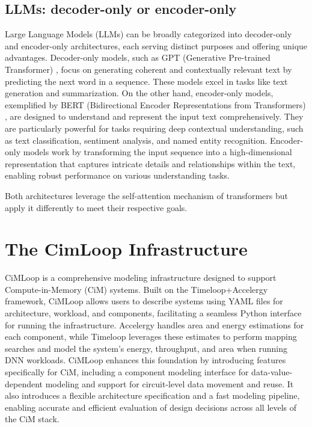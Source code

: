 \documentclass[conference]{IEEEtran}
\begin{document}
\subsection{LLMs: decoder-only or encoder-only}
Large Language Models (LLMs) can be broadly categorized into decoder-only and encoder-only architectures, each serving distinct purposes and offering unique advantages. Decoder-only models, such as GPT (Generative Pre-trained Transformer) \cite{radford2018improving}, focus on generating coherent and contextually relevant text by predicting the next word in a sequence. These models excel in tasks like text generation and summarization. On the other hand, encoder-only models, exemplified by BERT (Bidirectional Encoder Representations from Transformers) \cite{2018arXiv181004805D}, are designed to understand and represent the input text comprehensively. They are particularly powerful for tasks requiring deep contextual understanding, such as text classification, sentiment analysis, and named entity recognition. Encoder-only models work by transforming the input sequence into a high-dimensional representation that captures intricate details and relationships within the text, enabling robust performance on various understanding tasks.

Both architectures leverage the self-attention mechanism of transformers but apply it differently to meet their respective goals. 

\section{The CimLoop Infrastructure}
CiMLoop \cite{andrulis2024cimloopflexibleaccuratefast} is a comprehensive modeling infrastructure designed to support Compute-in-Memory (CiM) systems. Built on the Timeloop+Accelergy framework, CiMLoop allows users to describe systems using YAML files for architecture, workload, and components, facilitating a seamless Python interface for running the infrastructure. Accelergy \cite{8942149} handles area and energy estimations for each component, while Timeloop \cite{8695666} leverages these estimates to perform mapping searches and model the system's energy, throughput, and area when running DNN workloads. CiMLoop enhances this foundation by introducing features specifically for CiM, including a component modeling interface for data-value-dependent modeling and support for circuit-level data movement and reuse. It also introduces a flexible architecture specification and a fast modeling pipeline, enabling accurate and efficient evaluation of design decisions across all levels of the CiM stack.
\end{document}
